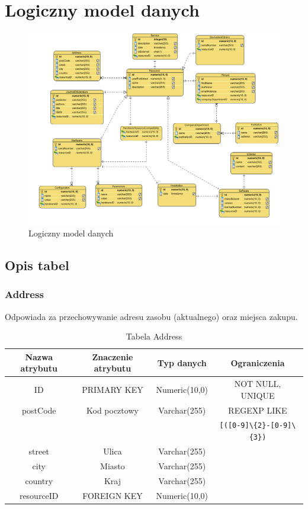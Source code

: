 \section{Logiczny model danych}

\begin{figure}[h!]
	\centering
	\includegraphics[scale=0.57, angle=270]{img/diagrams/LDM/LDM}
	\caption{Logiczny model danych\label{fig:labelLDM}}
\end{figure}
\bigskip
\subsection{Opis tabel}

\subsubsection{Address}
Odpowiada za przechowywanie adresu zasobu (aktualnego) oraz miejsca zakupu.
\begin{table}[H]
	\renewcommand\arraystretch{1.5}
	\renewcommand\tabcolsep{1.5pt}
\begin{tabular}{| c | c | c | c |} 
	\hline \textbf{Nazwa atrybutu} & \textbf{Znaczenie atrybutu} & \textbf{Typ danych} & \textbf{Ograniczenia} \\ 
	\hline ID & PRIMARY KEY & Numeric(10,0) & NOT NULL, UNIQUE \\ 
	\hline postCode & Kod pocztowy & Varchar(255) & REGEXP LIKE \\
	~ & ~ & ~ & \verb|[([0-9]\{2}-[0-9]\{3})| \\ 
	\hline street & Ulica & Varchar(255) &  \\ 
	\hline city & Miasto & Varchar(255) & \\ 
	\hline country & Kraj & Varchar(255) &  \\ 
	\hline resourceID & FOREIGN KEY & Numeric(10,0) & \\ 
	\hline 
\end{tabular}
\caption{Tabela Address}
\label{TAB:Address}
\end{table} 

